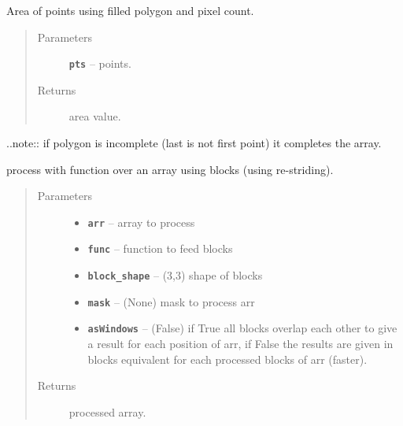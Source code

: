 \documentclass[letterpaper,10pt,english]{sphinxmanual}
\begin{document}

\begin{fulllineitems}
\label{RRtoolbox.lib.arrayops:RRtoolbox.lib.arrayops.basic.polygonArea_fill}
Area of points using filled polygon and pixel count.
\begin{quote}\begin{description}
\item[{Parameters}] \leavevmode
\textbf{\texttt{pts}} -- points.

\item[{Returns}] \leavevmode
area value.

\end{description}\end{quote}

..note:: if polygon is incomplete (last is not first point) it completes the array.

\end{fulllineitems}


\begin{fulllineitems}
\label{RRtoolbox.lib.arrayops:RRtoolbox.lib.arrayops.basic.process_as_blocks}
process with function over an array using blocks (using re-striding).
\begin{quote}\begin{description}
\item[{Parameters}] \leavevmode\begin{itemize}
\item {} 
\textbf{\texttt{arr}} -- array to process

\item {} 
\textbf{\texttt{func}} -- function to feed blocks

\item {} 
\textbf{\texttt{block\_shape}} -- (3,3) shape of blocks

\item {} 
\textbf{\texttt{mask}} -- (None) mask to process arr

\item {} 
\textbf{\texttt{asWindows}} -- (False) if True all blocks overlap each other to give
a result for each position of arr, if False the results are
given in blocks equivalent for each processed blocks of arr (faster).

\end{itemize}

\item[{Returns}] \leavevmode
processed array.

\end{description}\end{quote}

\end{fulllineitems}
\end{document}

